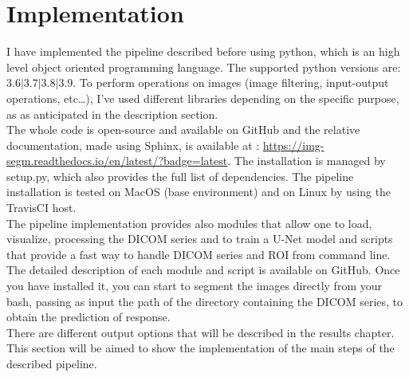 \documentclass{standalone}
\begin{document}
\section{Implementation}

I have implemented the pipeline described before using python, which is an high level object oriented programming language. 
The supported python versions are: $3.6| 3.7| 3.8| 3.9$.
To perform operations on images (image filtering, input-output operations, etc\dots), I've used different libraries depending on the specific purpose, as as anticipated in the description section.
\\
The whole code is open-source and available on GitHub \cite{img-segm} and the relative documentation, made using Sphinx, is available at : \url{https://img-segm.readthedocs.io/en/latest/?badge=latest}.
The installation is managed by setup.py, which also provides the full list of dependencies.
The pipeline installation is tested on MacOS (base environment) and on Linux by using the TravisCI host.
\\
The pipeline implementation provides also modules that allow one to load, visualize, processing the DICOM series and to train a U-Net model and scripts that provide a fast way to handle DICOM series and ROI from command line. 
\\
The detailed description of each module and script is available on GitHub.
Once you have installed it, you can start to segment the images directly from your bash, passing as input the path of the directory containing the DICOM series, to obtain the prediction of response.
\\
There are different output options that will be described in the results chapter.\\
This section will be aimed to show the implementation of the main steps of the described pipeline.
\end{document}
